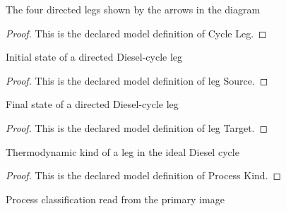 \begin{definition}
  \label{def:physics:phyx-mini-0438:phyxminiproblems-problemphyxmini0438-cycleleg}
  The four directed legs shown by the arrows in the diagram
\end{definition}
\begin{proof}
  This is the declared model definition of Cycle Leg.
\end{proof}
\begin{definition}
  \label{def:physics:phyx-mini-0438:phyxminiproblems-problemphyxmini0438-legsource}
  Initial state of a directed Diesel-cycle leg
\end{definition}
\begin{proof}
  This is the declared model definition of leg Source.
\end{proof}
\begin{definition}
  \label{def:physics:phyx-mini-0438:phyxminiproblems-problemphyxmini0438-legtarget}
  Final state of a directed Diesel-cycle leg
\end{definition}
\begin{proof}
  This is the declared model definition of leg Target.
\end{proof}
\begin{definition}
  \label{def:physics:phyx-mini-0438:phyxminiproblems-problemphyxmini0438-processkind}
  Thermodynamic kind of a leg in the ideal Diesel cycle
\end{definition}
\begin{proof}
  This is the declared model definition of Process Kind.
\end{proof}
\begin{definition}
  \label{def:physics:phyx-mini-0438:phyxminiproblems-problemphyxmini0438-displayedprocesskind}
  Process classification read from the primary image
\end{definition}
